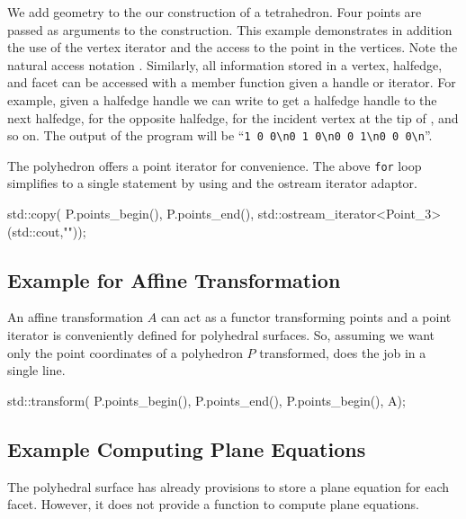 We add geometry to the our construction of a tetrahedron. Four points
are passed as arguments to the construction. This example demonstrates
in addition the use of the vertex iterator and the access to the point
in the vertices. Note the natural access notation .
Similarly, all information stored in a vertex, halfedge, and facet can
be accessed with a member function given a handle or iterator. For
example, given a halfedge handle  we can write 
to get a halfedge handle to the next halfedge,  for
the opposite halfedge,  for the incident vertex at
the tip of , and so on.  The output of the program will be
``\verb|1 0 0\n0 1 0\n0 0 1\n0 0 0\n|''.

{}

The polyhedron offers a point iterator for convenience. The above
\texttt{for} loop simplifies to a single statement by using
 and the ostream iterator adaptor.

\begin{ccExampleCode}
std::copy( P.points_begin(), P.points_end(), 
           std::ostream_iterator<Point_3>(std::cout,"\n"));
\end{ccExampleCode}

\subsection{Example for Affine Transformation}

An affine transformation $A$ can act as a functor transforming points
and a point iterator is conveniently defined for polyhedral surfaces.
So, assuming we want only the point coordinates of a polyhedron $P$
transformed,  does the job in a single line.

\begin{ccExampleCode}
std::transform( P.points_begin(), P.points_end(), P.points_begin(), A);
\end{ccExampleCode}


\subsection{Example Computing Plane Equations}

The polyhedral surface has already provisions to store a plane
equation for each facet. However, it does not provide a function to
compute plane equations.

